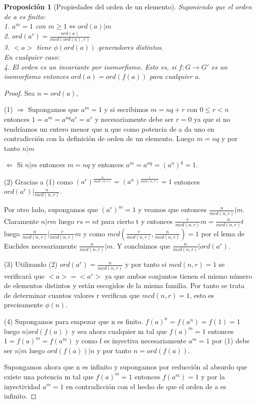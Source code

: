 \documentclass{article}
\theoremstyle{theorem-style}  %
\newtheorem{proposition}[theorem]{Proposición}
\theoremstyle{definition-style}
\theoremstyle{example-style}
\begin{document}
\begin{proposition}[Propiedades del orden de un elemento]
Suponiendo que el orden de a es finito: \\
1. $a^m = 1$ con $m \ge 1 \iff ord(a) | m$ \\
2. $ord(a^r) = \frac{ord(a)}{mcd(ord(a),r)}$ \\
3. $<a>$ tiene $\phi(ord(a))$ generadores distintos. \\
En cualquier caso: \\
4. El orden es un invariante por isomorfismo. Esto es, si $f:G \rightarrow G'$ es un isomorfismo entonces $ord(a) = ord(f(a))$ para cualquier a.
\end{proposition}
\begin{proof}
Sea $n = ord(a)$,

(1) $\Rightarrow$ Supongamos que $a^m = 1$ y si escribimos $m = nq + r$ con $0 \le r < n$ entonces $1=a^m = a^{nq}a^r = a^r$ y necesariamente debe ser $r = 0$ ya que si no tendríamos un entero menor que n que como potencia de a da uno en contradicción con la definición de orden de un elemento. Luego $m = nq$ y por tanto $n | m$

$\Leftarrow$ Si $n|m$ entonces $m = nq$ y entonces $a^m = a^{nq} = (a^n)^q = 1$.

(2) Gracias a (1) como $(a^r)^{\frac{n}{mcd(n,r)}} = (a^n)^{\frac{r}{mcd(n,r)}} = 1$ entonces $ord(a^r) | \frac{n}{mcd(n,r)}$. 

Por otro lado, supongamos que $(a^r)^m = 1$ y veamos que entonces $\frac{n}{mcd(n,r)} | m$. Claramente $n | rm$ luego $rs = nt$ para cierto t y entonces $\frac{r}{mcd(n,r)}m = \frac{n}{mcd(n,r)}t$ luego $\frac{n}{mcd(n,r)} | \frac{r}{mcd(n,r)}m$ y como $mcd\left(\frac{r}{mcd(n,r)},\frac{n}{mcd(n,r)}\right) = 1$ por el lema de Euclides necesariamente $\frac{n}{mcd(n,r)} | m$. Y concluimos que $\frac{n}{mcd(n,r)} | ord(a^r)$.

(3) Utilizando (2) $ord(a^r) = \frac{n}{mcd(n,r)}$ y por tanto si $mcd(n,r) = 1$  se verificará que $<a> = <a^r>$ ya que ambos conjuntos tienen el mismo número de elementos distintos y están escogidos de la misma familia. Por tanto se trata de determinar cuantos valores r verifican que $mcd(n,r) = 1$, esto es precisamente $\phi(n)$.

(4) Supongamos para empezar que n es finito. $f(a)^n=f(a^n)=f(1)=1$ luego $n |ord(f(a))$ y sea ahora cualquier m tal que $f(a)^m = 1$ entonces $1 = f(a)^m = f(a^m)$ y como f es inyectiva necesariamente $a^m = 1$ por (1) debe ser $n | m$ luego $ord(f(a)) | n$ y por tanto $n = ord(f(a))$.

Supongamos ahora que n es infinito y supongamos por reducción al absurdo que existe una potencia m tal que $f(a)^m = 1$ entonces $f(a^m) = 1$ y por la inyectividad $a^m = 1$ en contradicción con el hecho de que el orden de a es infinito.
\end{proof}
\end{document}
